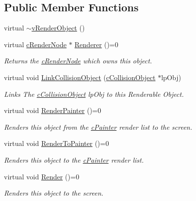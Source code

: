\subsection*{Public Member Functions}
\begin{DoxyCompactItemize}
\item 
virtual \hyperlink{classv_render_object_a1ad02f04355d5834b1d84991e5291dfb}{$\sim$vRenderObject} ()
\item 
virtual \hyperlink{classc_render_node}{cRenderNode} $\ast$ \hyperlink{classv_render_object_a558ba2b7a23cf687c0b0ec7d814a7744}{Renderer} ()=0
\begin{DoxyCompactList}\small\item\em Returns the \hyperlink{classc_render_node}{cRenderNode} which owns this object. \item\end{DoxyCompactList}\item 
virtual void \hyperlink{classv_render_object_a1cd8f4961222c39ecdfa5ca155699fa3}{LinkCollisionObject} (\hyperlink{classc_collision_object}{cCollisionObject} $\ast$lpObj)
\begin{DoxyCompactList}\small\item\em Links The \hyperlink{classc_collision_object}{cCollisionObject} lpObj to this Renderable Object. \item\end{DoxyCompactList}\item 
virtual void \hyperlink{classv_render_object_a5f7d30eaedefd5cfcc904d0e499a836d}{RenderPainter} ()=0
\begin{DoxyCompactList}\small\item\em Renders this object from the \hyperlink{classc_painter}{cPainter} render list to the screen. \item\end{DoxyCompactList}\item 
virtual void \hyperlink{classv_render_object_a8402746b2f0dce26964556c9167ad1e3}{RenderToPainter} ()=0
\begin{DoxyCompactList}\small\item\em Renders this object to the \hyperlink{classc_painter}{cPainter} render list. \item\end{DoxyCompactList}\item 
virtual void \hyperlink{classv_render_object_ae4bb9fb71f277f6b63e7dd6aeaedff5b}{Render} ()=0
\begin{DoxyCompactList}\small\item\em Renders this object to the screen. \item\end{DoxyCompactList}\item 

\end{DoxyCompactItemize}
